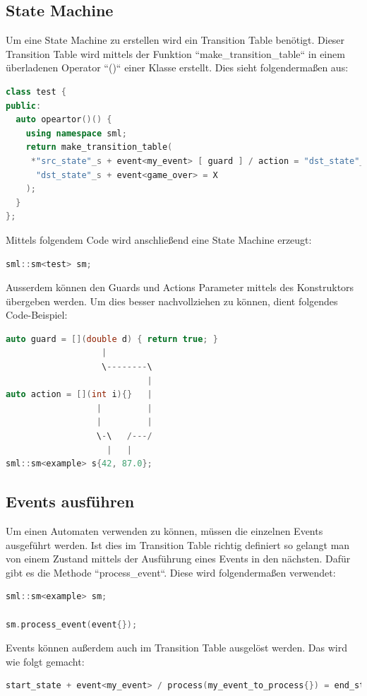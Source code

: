 \documentclass{report}
\begin{document}
\subsection{State Machine}
Um eine State Machine zu erstellen wird ein Transition Table benötigt. Dieser Transition Table wird mittels der Funktion ``make\_transition\_table`` in einem überladenen Operator ``()`` einer Klasse erstellt. Dies sieht folgendermaßen aus:
\begin{lstlisting}[language=C++]
class test {
public:
  auto opeartor()() {
    using namespace sml;
    return make_transition_table(
     *"src_state"_s + event<my_event> [ guard ] / action = "dst_state"_s,
      "dst_state"_s + event<game_over> = X
    );
  }
};
\end{lstlisting}
Mittels folgendem Code wird anschließend eine State Machine erzeugt:
\begin{lstlisting}[language=C++]
sml::sm<test> sm;
\end{lstlisting}
Ausserdem können den Guards und Actions Parameter mittels des Konstruktors übergeben werden. Um dies besser nachvollziehen zu können, dient folgendes Code-Beispiel:
\begin{lstlisting}[language=C++]
auto guard = [](double d) { return true; }
                   |
                   \--------\
                            |
auto action = [](int i){}   |
                  |         |
                  |         |
                  \-\   /---/
                    |   |
sml::sm<example> s{42, 87.0};
\end{lstlisting}

\subsection{Events ausführen}
Um einen Automaten verwenden zu können, müssen die einzelnen Events ausgeführt werden. Ist dies im Transition Table richtig definiert so gelangt man von einem Zustand mittels der Ausführung eines Events in den nächsten. Dafür gibt es die Methode ``process\_event``. Diese wird folgendermaßen verwendet:
\begin{lstlisting}[language=C++]
sml::sm<example> sm;

sm.process_event(event{});
\end{lstlisting}
Events können außerdem auch im Transition Table ausgelöst werden. Das wird wie folgt gemacht:
\begin{lstlisting}[language=C++]
start_state + event<my_event> / process(my_event_to_process{}) = end_state
\end{lstlisting}
\end{document}
